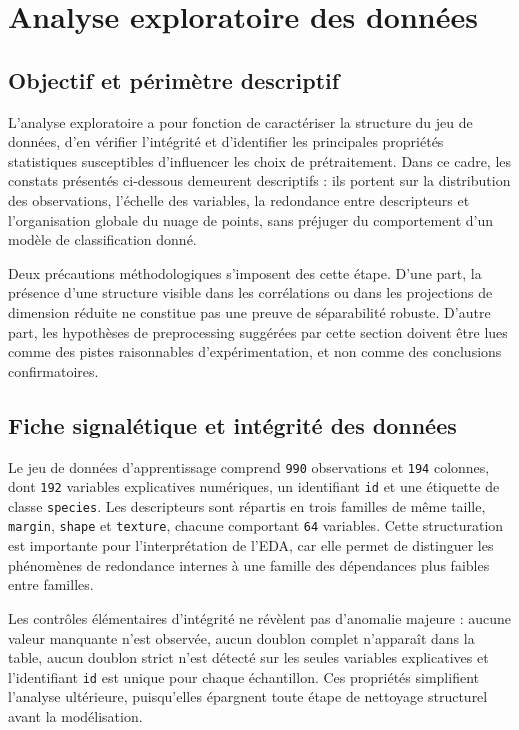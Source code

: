 \section{Analyse exploratoire des données}

\subsection{Objectif et périmètre descriptif}
L'analyse exploratoire a pour fonction de caractériser la structure du jeu de données, d'en vérifier l'intégrité et d'identifier les principales propriétés statistiques susceptibles d'influencer les choix de prétraitement. Dans ce cadre, les constats présentés ci-dessous demeurent descriptifs : ils portent sur la distribution des observations, l'échelle des variables, la redondance entre descripteurs et l'organisation globale du nuage de points, sans préjuger du comportement d'un modèle de classification donné.

Deux précautions méthodologiques s'imposent des cette étape. D'une part, la présence d'une structure visible dans les corrélations ou dans les projections de dimension réduite ne constitue pas une preuve de séparabilité robuste. D'autre part, les hypothèses de preprocessing suggérées par cette section doivent être lues comme des pistes raisonnables d'expérimentation, et non comme des conclusions confirmatoires.

\subsection{Fiche signalétique et intégrité des données}
Le jeu de données d'apprentissage comprend \texttt{990} observations et \texttt{194} colonnes, dont \texttt{192} variables explicatives numériques, un identifiant \texttt{id} et une étiquette de classe \texttt{species}. Les descripteurs sont répartis en trois familles de même taille, \texttt{margin}, \texttt{shape} et \texttt{texture}, chacune comportant \texttt{64} variables. Cette structuration est importante pour l'interprétation de l'EDA, car elle permet de distinguer les phénomènes de redondance internes à une famille des dépendances plus faibles entre familles.

Les contrôles élémentaires d'intégrité ne révèlent pas d'anomalie majeure : aucune valeur manquante n'est observée, aucun doublon complet n'apparaît dans la table, aucun doublon strict n'est détecté sur les seules variables explicatives et l'identifiant \texttt{id} est unique pour chaque échantillon. Ces propriétés simplifient l'analyse ultérieure, puisqu'elles épargnent toute étape de nettoyage structurel avant la modélisation.

